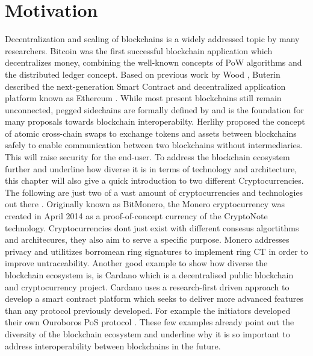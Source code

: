 \section{Motivation}
\label{sec:intro:motivation}
Decentralization and scaling of blockchains is a widely addressed topic by many researchers. Bitcoin \cite{nakamoto2008peer} was the first successful blockchain application which decentralizes money, combining the well-known concepts of \ac{PoW} algorithms and the distributed ledger concept. Based on previous work by Wood \cite{wood2014ethereum}, Buterin described the next-generation Smart Contract and decentralized application platform known as Ethereum \cite{buterin2013ethereum} \cite{buterin2014ethereum}. While most present blockchains still remain unconnected, pegged sidechains are formally defined by \cite{back2014enabling} and is the foundation for many proposals towards blockchain interoperabilty. Herlihy proposed the concept of atomic cross-chain swaps to exchange tokens and assets between blockchains safely \cite{herlihy2018atomic} to enable communication between two blockchains without intermediaries. This will raise security for the end-user. To address the blockchain ecosystem further and underline how diverse it is in terms of technology and architecture, this chapter will also give a quick introduction to two different Cryptocurrencies. The following are just two of a vast amount of cryptocurrencies and technologies out there \cite{coinmarketcap}. Originally known as BitMonero, the Monero cryptocurrency was created in April 2014 \cite{alonso2020zero} as a proof-of-concept currency of the CryptoNote \cite{van2013cryptonote} technology. Cryptocurrencies dont just exist with different consesus algortithms and architecures, they also aim to serve a specific purpose. Monero addresses privacy and utilitizes borromean ring signatures \cite{maxwell2015borromean} to implement ring \ac{CT} \cite{noether2016ring} in order to improve untraceability. Another good example to show how diverse the blockchain ecosystem is, is Cardano which is a decentralised public blockchain and cryptocurrency project. Cardano uses a research-first driven approach to develop a smart contract platform which seeks to deliver more advanced features than any protocol previously developed. For example the initiators developed their own Ouroboros \ac{PoS} protocol \cite{kiayias2017ouroboros}. These few examples already point out the diversity of the blockchain ecosystem and underline why it is so important to address interoperability between blockchains in the future.


